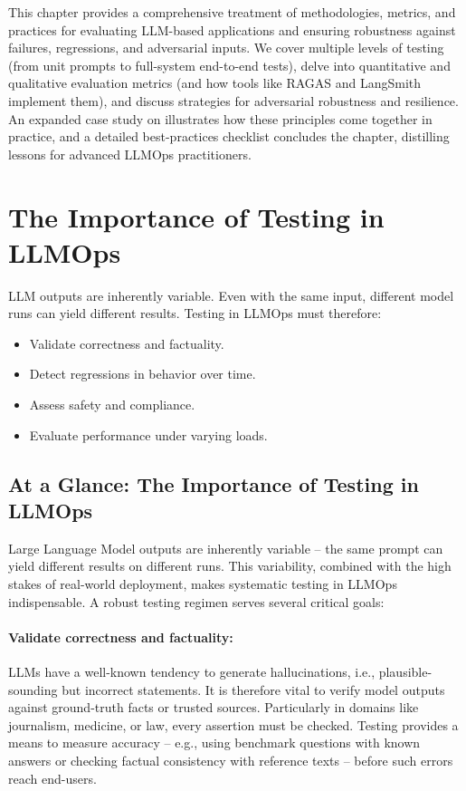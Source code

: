 This chapter provides a comprehensive treatment of methodologies, metrics, and practices for evaluating LLM-based applications and ensuring robustness against failures, regressions, and adversarial inputs. We cover multiple levels of testing (from unit prompts to full-system end-to-end tests), delve into quantitative and qualitative evaluation metrics (and how tools like RAGAS and LangSmith implement them), and discuss strategies for adversarial robustness and resilience. An expanded case study on \ishtar{} illustrates how these principles come together in practice, and a detailed best-practices checklist concludes the chapter, distilling lessons for advanced LLMOps practitioners.

\section{The Importance of Testing in LLMOps}
\label{sec:ch10-the-importance-of-testing-in-llmops}

LLM outputs are inherently variable. Even with the same input, different model runs can yield different results. Testing in LLMOps must therefore:
\begin{itemize}
    \item Validate correctness and factuality.
    \item Detect regressions in behavior over time.
    \item Assess safety and compliance.
    \item Evaluate performance under varying loads.
\end{itemize}

\subsection*{At a Glance: The Importance of Testing in LLMOps}
Large Language Model outputs are inherently variable – the same prompt can yield different results on different runs. This variability, combined with the high stakes of real-world deployment, makes systematic testing in LLMOps indispensable. A robust testing regimen serves several critical goals:

\paragraph*{Validate correctness and factuality:}
LLMs have a well-known tendency to generate hallucinations, i.e., plausible-sounding but incorrect statements. It is therefore vital to verify model outputs against ground-truth facts or trusted sources. Particularly in domains like journalism, medicine, or law, every assertion must be checked. Testing provides a means to measure accuracy – e.g., using benchmark questions with known answers or checking factual consistency with reference texts – before such errors reach end-users.

